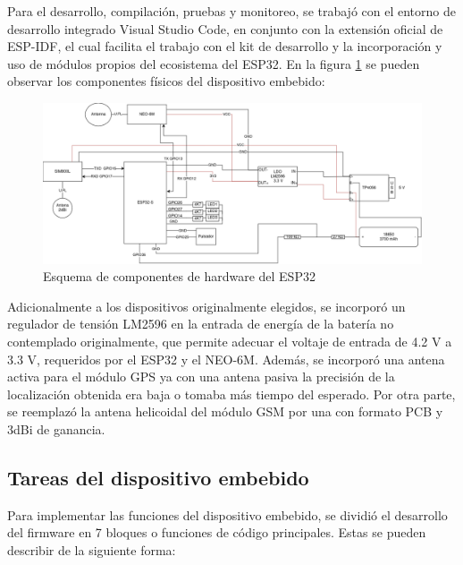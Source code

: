 Para el desarrollo, compilación, pruebas y monitoreo, se trabajó con el entorno de desarrollo integrado Visual Studio Code, en conjunto con la extensión oficial de ESP-IDF, el cual facilita el trabajo con el kit de desarrollo y la incorporación y uso de módulos propios del ecosistema del ESP32. En la figura \ref{fig:esp32:diagrama} se pueden observar los componentes físicos del dispositivo embebido:


\begin{figure}[H]
	\centering
	\includegraphics[width=1\textwidth]{./Figures/esp32-arquitectura.png}
	\caption{Esquema de componentes de hardware del ESP32}
	\label{fig:esp32:diagrama}
\end{figure}

Adicionalmente a los dispositivos originalmente elegidos, se incorporó un regulador de tensión LM2596 en la entrada de energía de la batería no contemplado originalmente, que permite adecuar el voltaje de entrada de 4.2 V a 3.3 V\citep{LM2596:1}, requeridos por el ESP32 y el NEO-6M. Además, se incorporó una antena activa para el módulo GPS ya con una antena pasiva la precisión de la localización obtenida era baja o tomaba más tiempo del esperado. Por otra parte, se reemplazó la antena helicoidal del módulo GSM por una con formato PCB y 3dBi de ganancia.


\subsection{Tareas del dispositivo embebido}

Para implementar las funciones del dispositivo embebido, se dividió el desarrollo del firmware en 7 bloques o funciones de código principales. Estas se pueden describir de la siguiente forma:

